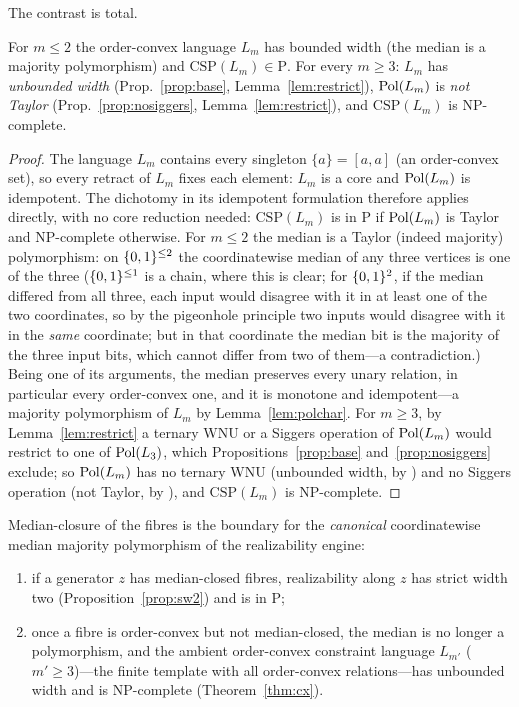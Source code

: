 The contrast is total.

\begin{thm}\label{thm:cx}
  For $m\le2$ the order-convex language $L_m$ has bounded width (the
  median is a majority polymorphism) and $\mathrm{CSP}(L_m)\in\mathrm P$.
  For every $m\ge3$: $L_m$ has \emph{unbounded width}
  (Prop.~\ref{prop:base}, Lemma~\ref{lem:restrict}), $\operatorname{Pol}(L_m)$ is
  \emph{not Taylor} (Prop.~\ref{prop:nosiggers}, Lemma~\ref{lem:restrict}),
  and $\mathrm{CSP}(L_m)$ is $\mathrm{NP}$-complete.
\end{thm}
\begin{proof}
  The language $L_m$ contains every singleton $\{a\}=[a,a]$ (an
  order-convex set), so every retract of $L_m$ fixes each element:
  $L_m$ is a core and $\operatorname{Pol}(L_m)$ is idempotent.  The dichotomy
  \cite{Bulatov,Zhuk} in its idempotent formulation therefore applies
  directly, with no core reduction needed: $\mathrm{CSP}(L_m)$ is in
  $\mathrm P$ if $\operatorname{Pol}(L_m)$ is Taylor and $\mathrm{NP}$-complete
  otherwise.  For $m\le2$ the median is a Taylor (indeed majority)
  polymorphism: on $\{0,1\}^{\le2}$ the coordinatewise median of any three
  vertices is one of the three ($\{0,1\}^{\le1}$ is a chain, where this is
  clear; for $\{0,1\}^2$, if the median differed from all three,
  each input would disagree with it in at least one of the two
  coordinates, so by the pigeonhole principle two inputs would disagree
  with it in the \emph{same} coordinate; but in that coordinate the median
  bit is the majority of the three input bits, which cannot differ from
  two of them---a contradiction.)  Being one of its arguments, the median
  preserves every unary relation, in particular every order-convex one,
  and it is monotone and idempotent---a majority polymorphism of $L_m$ by
  Lemma~\ref{lem:polchar}.  For $m\ge3$,
  by Lemma~\ref{lem:restrict} a ternary WNU
  or a Siggers operation of $\operatorname{Pol}(L_m)$ would restrict to one of
  $\operatorname{Pol}(L_3)$, which Propositions~\ref{prop:base} and~\ref{prop:nosiggers}
  exclude; so $\operatorname{Pol}(L_m)$ has no ternary WNU (unbounded width, by
  \cite{BartoKozik,KKVW}) and no Siggers operation (not Taylor, by
  \cite{Siggers,KMM}), and $\mathrm{CSP}(L_m)$ is $\mathrm{NP}$-complete.
\end{proof}

\begin{cor}\label{cor:boundary}
  Median-closure of the fibres is the boundary for the \emph{canonical}
  coordinatewise median majority polymorphism of the realizability engine:
  \begin{enumerate}
  \item if a generator $z$ has median-closed fibres, realizability along
    $z$ has strict width two (Proposition~\ref{prop:sw2}) and is in
    $\mathrm P$;
  \item once a fibre is order-convex but not median-closed, the median is
    no longer a polymorphism, and the ambient order-convex constraint
    language $L_{m'}$ ($m'\ge3$)---the finite template with all
    order-convex relations---has unbounded width and is
    $\mathrm{NP}$-complete (Theorem~\ref{thm:cx}).
  \end{enumerate}
\end{cor}

